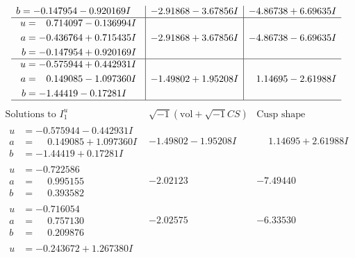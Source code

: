 \documentclass[1p]{elsarticle_modified}
\theoremstyle{definition}
\newcommand{\I}{\sqrt{-1}}
\begin{document}
$$\begin{array}{c|c|c}
\begin{aligned}
b &= -0.147954 - 0.920169 I\end{aligned}
 & -2.91868 - 3.67856 I & -4.86738 + 6.69635 I \\ \hline\begin{aligned}
u &= \phantom{-}0.714097 - 0.136994 I \\
a &= -0.436764 + 0.715435 I \\
b &= -0.147954 + 0.920169 I\end{aligned}
 & -2.91868 + 3.67856 I & -4.86738 - 6.69635 I \\ \hline\begin{aligned}
u &= -0.575944 + 0.442931 I \\
a &= \phantom{-}0.149085 - 1.097360 I \\
b &= -1.44419 - 0.17281 I\end{aligned}
 & -1.49802 + 1.95208 I & \phantom{-}1.14695 - 2.61988 I\\
 \hline 
 \end{array}$$\newpage$$\begin{array}{c|c|c}  
\text{Solutions to }I^u_{1}& \I (\text{vol} + \sqrt{-1}CS) & \text{Cusp shape}\\
 \hline 
\begin{aligned}
u &= -0.575944 - 0.442931 I \\
a &= \phantom{-}0.149085 + 1.097360 I \\
b &= -1.44419 + 0.17281 I\end{aligned}
 & -1.49802 - 1.95208 I & \phantom{-}1.14695 + 2.61988 I \\ \hline\begin{aligned}
u &= -0.722586\phantom{ +0.000000I} \\
a &= \phantom{-}0.995155\phantom{ +0.000000I} \\
b &= \phantom{-}0.393582\phantom{ +0.000000I}\end{aligned}
 & -2.02123\phantom{ +0.000000I} & -7.49440\phantom{ +0.000000I} \\ \hline\begin{aligned}
u &= -0.716054\phantom{ +0.000000I} \\
a &= \phantom{-}0.757130\phantom{ +0.000000I} \\
b &= \phantom{-}0.209876\phantom{ +0.000000I}\end{aligned}
 & -2.02575\phantom{ +0.000000I} & -6.33530\phantom{ +0.000000I} \\ \hline\begin{aligned}
u &= -0.243672 + 1.267380 I \\

\end{aligned}
\end{array}$$
\end{document}
